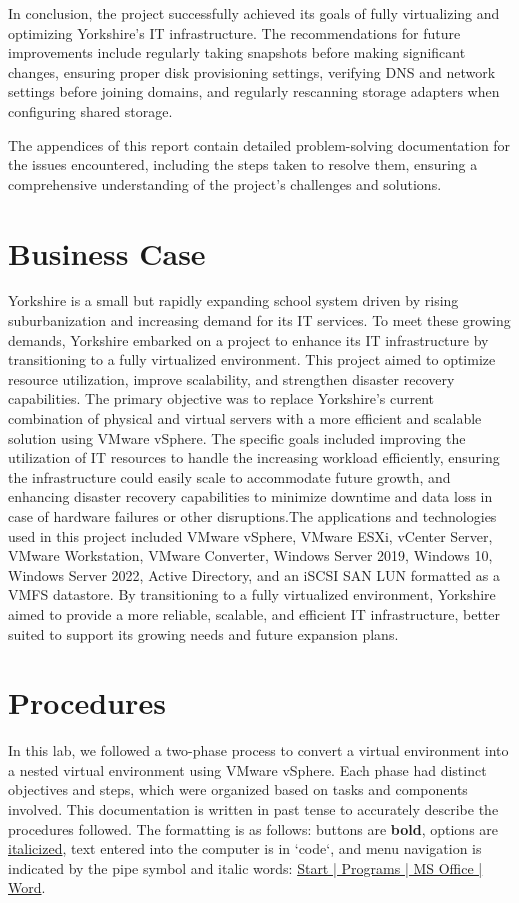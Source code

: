 \documentclass[letterpaper,12pt]{article}
\begin{document}
In conclusion, the project successfully achieved its goals of fully virtualizing and optimizing Yorkshire's IT infrastructure. The recommendations for future improvements include regularly taking snapshots before making significant changes, ensuring proper disk provisioning settings, verifying DNS and network settings before joining domains, and regularly rescanning storage adapters when configuring shared storage.

The appendices of this report contain detailed problem-solving documentation for the issues encountered, including the steps taken to resolve them, ensuring a comprehensive understanding of the project's challenges and solutions.
\section{Business Case}
\label{sec:org42ff23a}
Yorkshire is a small but rapidly expanding school system driven by rising suburbanization and increasing demand for its IT services. To meet these growing demands, Yorkshire embarked on a project to enhance its IT infrastructure by transitioning to a fully virtualized environment. This project aimed to optimize resource utilization, improve scalability, and strengthen disaster recovery capabilities. The primary objective was to replace Yorkshire's current combination of physical and virtual servers with a more efficient and scalable solution using VMware vSphere. The specific goals included improving the utilization of IT resources to handle the increasing workload efficiently, ensuring the infrastructure could easily scale to accommodate future growth, and enhancing disaster recovery capabilities to minimize downtime and data loss in case of hardware failures or other disruptions.The applications and technologies used in this project included VMware vSphere, VMware ESXi, vCenter Server, VMware Workstation, VMware Converter, Windows Server 2019, Windows 10, Windows Server 2022, Active Directory, and an iSCSI SAN LUN formatted as a VMFS datastore. By transitioning to a fully virtualized environment, Yorkshire aimed to provide a more reliable, scalable, and efficient IT infrastructure, better suited to support its growing needs and future expansion plans.
\section{Procedures}
\label{sec:org511b1e8}

In this lab, we followed a two-phase process to convert a virtual environment into a nested virtual environment using VMware vSphere. Each phase had distinct objectives and steps, which were organized based on tasks and components involved. This documentation is written in past tense to accurately describe the procedures followed. The formatting is as follows: buttons are \textbf{bold}, options are \uline{italicized}, text entered into the computer is in `code`, and menu navigation is indicated by the pipe symbol and italic words: \uline{Start | Programs | MS Office | Word}.
\end{document}
